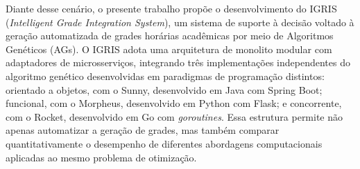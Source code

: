 Diante desse cenário, o presente trabalho propõe o desenvolvimento do IGRIS (\textit{Intelligent Grade Integration System}), um sistema de suporte à decisão voltado à geração automatizada de grades horárias acadêmicas por meio de Algoritmos Genéticos (AGs). O IGRIS adota uma arquitetura de monolito modular com adaptadores de microsserviços, integrando três implementações independentes do algoritmo genético desenvolvidas em paradigmas de programação distintos: orientado a objetos, com o Sunny, desenvolvido em Java com Spring Boot; funcional, com o Morpheus, desenvolvido em Python com Flask; e concorrente, com o Rocket, desenvolvido em Go com \textit{goroutines}. Essa estrutura permite não apenas automatizar a geração de grades, mas também comparar quantitativamente o desempenho de diferentes abordagens computacionais aplicadas ao mesmo problema de otimização.
